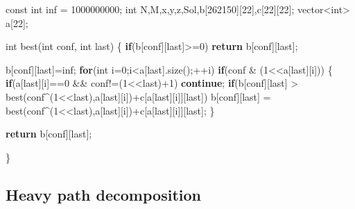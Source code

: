 \documentclass[10pt,]{article}
\newenvironment{Shaded}{}{}
\newcommand{\KeywordTok}[1]{\textcolor[rgb]{0.00,0.44,0.13}{\textbf{{#1}}}}
\newcommand{\DataTypeTok}[1]{\textcolor[rgb]{0.56,0.13,0.00}{{#1}}}
\newcommand{\DecValTok}[1]{\textcolor[rgb]{0.25,0.63,0.44}{{#1}}}
\newcommand{\NormalTok}[1]{{#1}}
\begin{document}
\begin{Shaded}
\begin{Highlighting}[]
\DataTypeTok{const} \DataTypeTok{int} \NormalTok{inf = }\DecValTok{1000000000}\NormalTok{;}
\DataTypeTok{int} \NormalTok{N,M,x,y,z,Sol,b[}\DecValTok{262150}\NormalTok{][}\DecValTok{22}\NormalTok{],c[}\DecValTok{22}\NormalTok{][}\DecValTok{22}\NormalTok{];}
\NormalTok{vector<}\DataTypeTok{int}\NormalTok{> a[}\DecValTok{22}\NormalTok{];}

\DataTypeTok{int} \NormalTok{best(}\DataTypeTok{int} \NormalTok{conf, }\DataTypeTok{int} \NormalTok{last)}
\NormalTok{\{}
  \KeywordTok{if}\NormalTok{(b[conf][last]>=}\DecValTok{0}\NormalTok{)}
    \KeywordTok{return} \NormalTok{b[conf][last];}

  \NormalTok{b[conf][last]=inf;}
  \KeywordTok{for}\NormalTok{(}\DataTypeTok{int} \NormalTok{i=}\DecValTok{0}\NormalTok{;i<a[last].size();++i)}
    \KeywordTok{if}\NormalTok{(conf & (}\DecValTok{1}\NormalTok{<<a[last][i]))}
    \NormalTok{\{}
      \KeywordTok{if}\NormalTok{(a[last][i]==}\DecValTok{0} \NormalTok{&& conf!=(}\DecValTok{1}\NormalTok{<<last)+}\DecValTok{1}\NormalTok{)}
        \KeywordTok{continue}\NormalTok{;}
      \KeywordTok{if}\NormalTok{(b[conf][last] > best(conf^(}\DecValTok{1}\NormalTok{<<last),a[last][i])+c[a[last][i]][last])}
        \NormalTok{b[conf][last] = best(conf^(}\DecValTok{1}\NormalTok{<<last),a[last][i])+c[a[last][i]][last];}
    \NormalTok{\}}

  \KeywordTok{return} \NormalTok{b[conf][last];}

\NormalTok{\}}
\end{Highlighting}
\end{Shaded}

\subsection{Heavy path decomposition}
\end{document}
